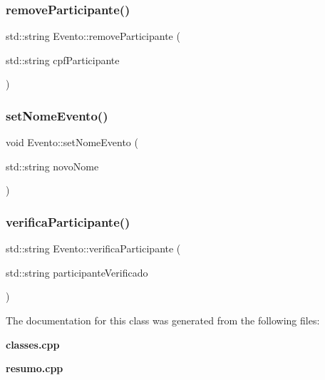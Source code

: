 \mbox{\label{class_evento_a70cfddabe50e5c30192793df05ae2e98}} 
\subsubsection{remove\+Participante()}
{\footnotesize\ttfamily std\+::string Evento\+::remove\+Participante (\begin{DoxyParamCaption}\item[{std\+::string}]{cpf\+Participante }\end{DoxyParamCaption})\hspace{0.3cm}{\ttfamily [inline]}}

\mbox{\label{class_evento_a5937b444c2eaab9142ca4c471b0bf6e2}} 
\subsubsection{set\+Nome\+Evento()}
{\footnotesize\ttfamily void Evento\+::set\+Nome\+Evento (\begin{DoxyParamCaption}\item[{std\+::string}]{novo\+Nome }\end{DoxyParamCaption})\hspace{0.3cm}{\ttfamily [inline]}}

\mbox{\label{class_evento_a1ece82df7056f7815effbc5864c23278}} 
\subsubsection{verifica\+Participante()}
{\footnotesize\ttfamily std\+::string Evento\+::verifica\+Participante (\begin{DoxyParamCaption}\item[{std\+::string}]{participante\+Verificado }\end{DoxyParamCaption})\hspace{0.3cm}{\ttfamily [inline]}}



The documentation for this class was generated from the following files\+:\begin{DoxyCompactItemize}
\item 
\textbf{ classes.\+cpp}\item 
\textbf{ resumo.\+cpp}\end{DoxyCompactItemize}
